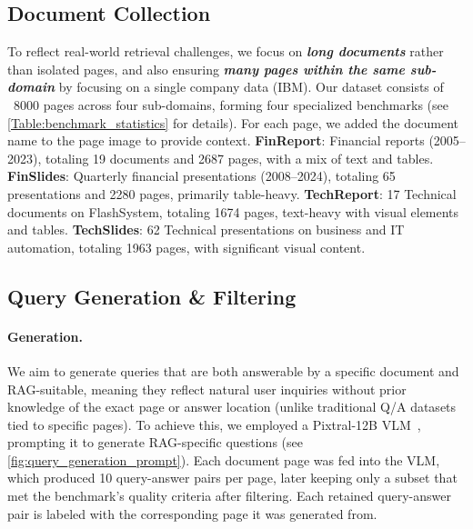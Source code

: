 \subsection{Document Collection}
To reflect real-world retrieval challenges, we focus on \emph{\textbf{long documents}} rather than isolated pages, and also ensuring \emph{\textbf{many pages within the same sub-domain}} by focusing on a single company data (IBM). Our dataset consists of ~8000 pages across four sub-domains, forming four specialized benchmarks (see \cref{Table:benchmark_statistics} for details). For each page, we added the document name to the page image to provide context.
\textbf{FinReport}: Financial reports (2005--2023), totaling 19 documents and 2687 pages, with a mix of text and tables.  
\textbf{FinSlides}: Quarterly financial presentations (2008--2024), totaling 65 presentations and 2280 pages, primarily table-heavy.  
\textbf{TechReport}: 17 Technical documents on FlashSystem, totaling 1674 pages, text-heavy with visual elements and tables. 
\textbf{TechSlides}: 62 Technical presentations on business and IT automation, totaling 1963 pages, with significant visual content. 


\subsection{Query Generation \& Filtering}
\paragraph{Generation.} We aim to generate queries that are both answerable by a specific document and RAG-suitable, meaning they reflect natural user inquiries without prior knowledge of the exact page or answer location (unlike traditional Q/A datasets tied to specific pages). 
To achieve this, we employed a Pixtral-12B VLM~\citep{agrawal2024pixtral}, prompting it to generate RAG-specific questions (see \cref{fig:query_generation_prompt}). Each document page was fed into the VLM, which produced 10 query-answer pairs per page, later keeping only a subset that met the benchmark’s quality criteria after filtering. Each retained query-answer pair is labeled with the corresponding page it was generated from.




